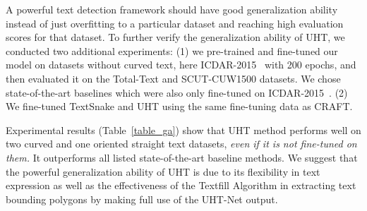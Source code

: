 \documentclass[10pt,twocolumn,letterpaper]{article}
\begin{document}
A powerful text detection framework should have good generalization ability instead of just overfitting to a particular dataset and reaching high evaluation scores for that dataset. To further verify the generalization ability of UHT, we conducted two additional experiments: (1) we pre-trained and fine-tuned our model on datasets without curved text, here ICDAR-2015~\cite{icdar2015} with 200 epochs, and then evaluated it on the Total-Text and SCUT-CUW1500 datasets. We chose state-of-the-art baselines which were also only fine-tuned on ICDAR-2015~\cite{icdar2015}.  (2) We fine-tuned TextSnake\cite{textsnake} and UHT using the same fine-tuning data as CRAFT\cite{craft}.     

Experimental results (Table~\ref{table_ga}) show that UHT method performs well on two curved and one oriented straight text datasets, {\em even if it is not fine-tuned on them.} It outperforms all listed state-of-the-art baseline methods. We suggest that the powerful generalization ability of UHT is due to its flexibility in text expression as well as the effectiveness of the Textfill Algorithm in extracting text bounding polygons by making full use of the UHT-Net output.
\end{document}
